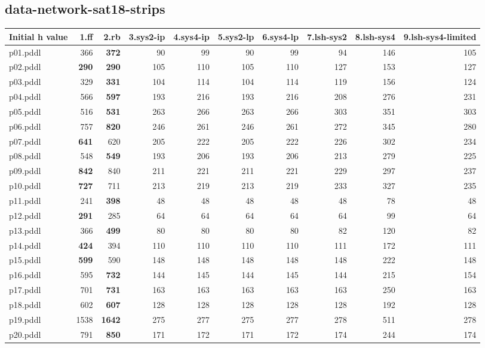 \documentclass{article}
\begin{document}
\hypertarget{initial_h_value-data-network-sat18-strips}{}
\subsection*{data-network-sat18-strips}

\begin{tabular}{@{}lrrrrrrrrr@{}}
Initial h value & 1.ff & 2.rb & 3.sys2-ip & 4.sys4-ip & 5.sys2-lp & 6.sys4-lp & 7.lsh-sys2 & 8.lsh-sys4 & 9.lsh-sys4-limited \\
\midrule
p01.pddl & 366 & \textbf{372} & 90 & 99 & 90 & 99 & 94 & 146 & 105 \\
p02.pddl & \textbf{290} & \textbf{290} & 105 & 110 & 105 & 110 & 127 & 153 & 127 \\
p03.pddl & 329 & \textbf{331} & 104 & 114 & 104 & 114 & 119 & 156 & 124 \\
p04.pddl & 566 & \textbf{597} & 193 & 216 & 193 & 216 & 208 & 276 & 231 \\
p05.pddl & 516 & \textbf{531} & 263 & 266 & 263 & 266 & 303 & 351 & 303 \\
p06.pddl & 757 & \textbf{820} & 246 & 261 & 246 & 261 & 272 & 345 & 280 \\
p07.pddl & \textbf{641} & 620 & 205 & 222 & 205 & 222 & 226 & 302 & 234 \\
p08.pddl & 548 & \textbf{549} & 193 & 206 & 193 & 206 & 213 & 279 & 225 \\
p09.pddl & \textbf{842} & 840 & 211 & 221 & 211 & 221 & 229 & 297 & 237 \\
p10.pddl & \textbf{727} & 711 & 213 & 219 & 213 & 219 & 233 & 327 & 235 \\
p11.pddl & 241 & \textbf{398} & 48 & 48 & 48 & 48 & 48 & 78 & 48 \\
p12.pddl & \textbf{291} & 285 & 64 & 64 & 64 & 64 & 64 & 99 & 64 \\
p13.pddl & 366 & \textbf{499} & 80 & 80 & 80 & 80 & 82 & 120 & 82 \\
p14.pddl & \textbf{424} & 394 & 110 & 110 & 110 & 110 & 111 & 172 & 111 \\
p15.pddl & \textbf{599} & 590 & 148 & 148 & 148 & 148 & 148 & 222 & 148 \\
p16.pddl & 595 & \textbf{732} & 144 & 145 & 144 & 145 & 144 & 215 & 154 \\
p17.pddl & 701 & \textbf{731} & 163 & 163 & 163 & 163 & 163 & 250 & 163 \\
p18.pddl & 602 & \textbf{607} & 128 & 128 & 128 & 128 & 128 & 192 & 128 \\
p19.pddl & 1538 & \textbf{1642} & 275 & 277 & 275 & 277 & 278 & 511 & 278 \\
p20.pddl & 791 & \textbf{850} & 171 & 172 & 171 & 172 & 174 & 244 & 174 \\
\end{tabular}
\end{document}
